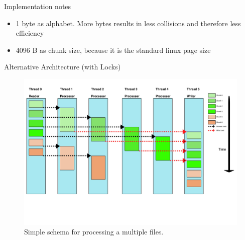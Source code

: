 \begin{frame}{Implementation notes}
    \begin{itemize}
        \item 1 byte as alphabet. More bytes results in less collisions and therefore less efficiency
        \item 4096 B as chunk size, because it is the standard linux page size
    \end{itemize}
\end{frame} 

\begin{frame}{Alternative Architecture (with Locks)}
    \begin{figure}
        \centering
        \includegraphics[width=\linewidth]{../imgs/dedicated IO threads}
        \caption{Simple schema for processing a multiple files.}
        \label{fig:threading}
    \end{figure}
\end{frame}

